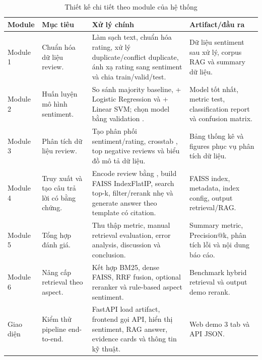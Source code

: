 \begin{longtable}{L{0.13\textwidth}L{0.22\textwidth}L{0.34\textwidth}L{0.21\textwidth}}
\caption{Thiết kế chi tiết theo module của hệ thống}\label{tab:detailed-module-design}\\
\toprule
Module & Mục tiêu & Xử lý chính & Artifact/đầu ra \\
\midrule
Module 1 & Chuẩn hóa dữ liệu review. & Làm sạch text, chuẩn hóa rating, xử lý duplicate/conflict duplicate, ánh xạ rating sang sentiment và chia train/valid/test. & Dữ liệu sentiment sau xử lý, corpus RAG và summary dữ liệu. \\
Module 2 & Huấn luyện mô hình sentiment. & So sánh majority baseline, \TFIDF{} + Logistic Regression và \TFIDF{} + Linear SVM; chọn model bằng validation \MacroFOne{}. & Model tốt nhất, metric test, classification report và confusion matrix. \\
Module 3 & Phân tích dữ liệu review. & Tạo phân phối sentiment/rating, crosstab \RatingSentiment{}, top negative reviews và biểu đồ mô tả dữ liệu. & Bảng thống kê và figures phục vụ phân tích dữ liệu. \\
Module 4 & Truy xuất và tạo câu trả lời có bằng chứng. & Encode review bằng \MultilingualE{}, build FAISS IndexFlatIP, search top-k, filter/rerank nhẹ và generate answer theo template có citation. & FAISS index, metadata, index config, output retrieval/RAG. \\
Module 5 & Tổng hợp đánh giá. & Thu thập metric, manual retrieval evaluation, error analysis, discussion và conclusion. & Summary metric, Precision@k, phân tích lỗi và nội dung báo cáo. \\
Module 6 & Nâng cấp retrieval theo aspect. & Kết hợp BM25, dense FAISS, RRF fusion, optional reranker và rule-based aspect sentiment. & Benchmark hybrid retrieval và output demo rerank. \\
Giao diện & Kiểm thử pipeline end-to-end. & FastAPI load artifact, frontend gọi API, hiển thị sentiment, RAG answer, evidence cards và thông tin kỹ thuật. & Web demo 3 tab và API JSON. \\
\bottomrule
\end{longtable}

